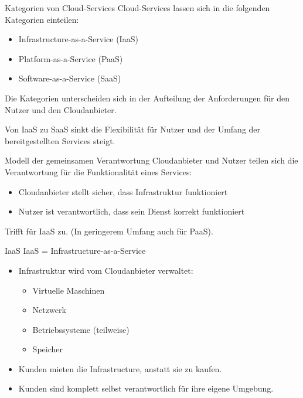 
\begin{flashcard}[Definition]{Kategorien von Cloud-Services}
    Cloud-Services lassen sich in die folgenden Kategorien einteilen:
    \begin{itemize}
        \item Infrastructure-as-a-Service (IaaS)
        \item Platform-as-a-Service (PaaS)
        \item Software-as-a-Service (SaaS)
    \end{itemize}
    Die Kategorien unterscheiden sich in der Aufteilung der Anforderungen für den Nutzer und den Cloudanbieter.

    Von IaaS zu SaaS sinkt die Flexibilität für Nutzer und der Umfang der bereitgestellten Services steigt.

\end{flashcard}

\begin{flashcard}[Definition]{Modell der gemeinsamen Verantwortung}
    Cloudanbieter und Nutzer teilen sich die Verantwortung für die Funktionalität eines Services:
    \begin{itemize}
        \item Cloudanbieter stellt sicher, dass Infrastruktur funktioniert
        \item Nutzer ist verantwortlich, dass sein Dienst korrekt funktioniert
    \end{itemize}
    Trifft für IaaS zu. (In geringerem Umfang auch für PaaS).
\end{flashcard}

\begin{flashcard}[Definition]{IaaS}
    IaaS = Infrastructure-as-a-Service

    \begin{itemize}
        \item Infrastruktur wird vom Cloudanbieter verwaltet:
        \begin{itemize}
            \item Virtuelle Maschinen
            \item Netzwerk
            \item Betriebssysteme (teilweise)
            \item Speicher
        \end{itemize}
        \item Kunden mieten die Infrastructure, anstatt sie zu kaufen.
        \item Kunden sind komplett selbst verantwortlich für ihre eigene Umgebung.
    \end{itemize}
\end{flashcard}

